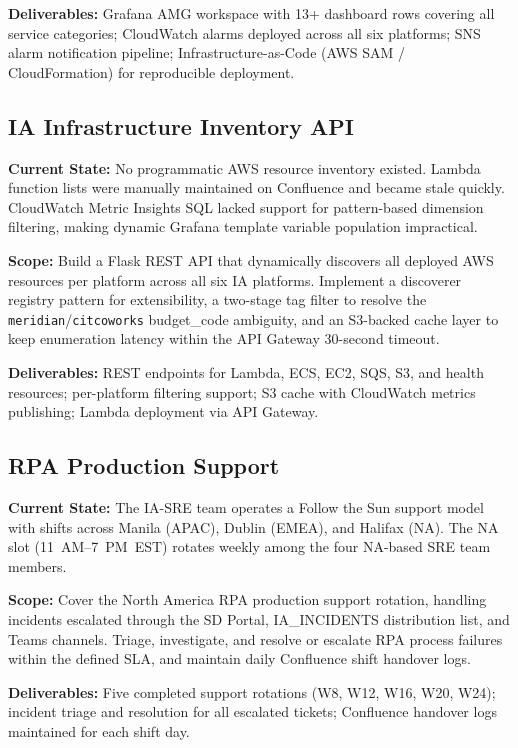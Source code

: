 \textbf{Deliverables:} 
Grafana AMG workspace with 13+ dashboard rows
covering all service categories; CloudWatch alarms deployed across all
six platforms; SNS alarm notification pipeline; Infrastructure-as-Code
(AWS SAM / CloudFormation) for reproducible deployment.


\subsection{IA Infrastructure Inventory API}

\textbf{Current State:} 
No programmatic AWS resource inventory existed.
Lambda function lists were manually maintained on Confluence and became
stale quickly. CloudWatch Metric Insights SQL lacked support for
pattern-based dimension filtering, making dynamic Grafana template variable
population impractical.

\textbf{Scope:} 
Build a Flask REST API that dynamically discovers all
deployed AWS resources per platform across all six IA platforms. Implement
a discoverer registry pattern for extensibility, a two-stage tag filter
to resolve the \texttt{meridian}/\texttt{citcoworks} budget\_code ambiguity,
and an S3-backed cache layer to keep enumeration latency within the
API Gateway 30-second timeout.

\textbf{Deliverables:} 
REST endpoints for Lambda, ECS, EC2, SQS, S3, and
health resources; per-platform filtering support; S3 cache with
CloudWatch metrics publishing; Lambda deployment via API Gateway.


\subsection{RPA Production Support}

\textbf{Current State:} 
The IA-SRE team operates a Follow the Sun support
model with shifts across Manila (APAC), Dublin (EMEA), and Halifax (NA).
The NA slot (11~AM--7~PM~EST) rotates weekly among the four NA-based
SRE team members.

\textbf{Scope:} 
Cover the North America RPA production support rotation,
handling incidents escalated through the SD Portal, IA\_INCIDENTS
distribution list, and Teams channels. Triage, investigate, and resolve
or escalate RPA process failures within the defined SLA, and maintain
daily Confluence shift handover logs.

\textbf{Deliverables:} 
Five completed support rotations (W8, W12, W16,
W20, W24); incident triage and resolution for all escalated tickets;
Confluence handover logs maintained for each shift day.


